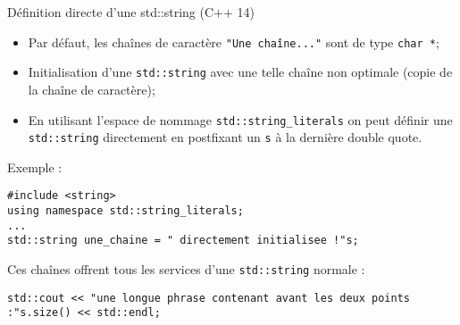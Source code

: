 \documentclass[compress,10pt,aspectratio=169]{beamer}
\begin{document}
\begin{frame}[fragile]{Définition directe d'une std::string (C++ 14)}
    \scriptsize 
    \begin{itemize}
    \item Par défaut, les chaînes de caractère \texttt{"Une chaîne..."} sont de type \texttt{char *};
    \item Initialisation d'une \texttt{std::string} avec une telle chaîne non optimale (copie de la chaîne de caractère);
    \item En utilisant l'espace de nommage \texttt{std::string\_literals} on peut définir une \texttt{std::string} directement en postfixant
    un \texttt{s} à la dernière double quote.
    \end{itemize}

    \begin{exampleblock}{\small Exemple :}
\begin{verbatim}
#include <string>
using namespace std::string_literals;
... 
std::string une_chaine = " directement initialisee !"s;
\end{verbatim}
\end{exampleblock}
Ces chaînes offrent tous les services d'une \texttt{std::string} normale :
\begin{verbatim}
std::cout << "une longue phrase contenant avant les deux points :"s.size() << std::endl;
\end{verbatim}
\end{frame}
\end{document}
